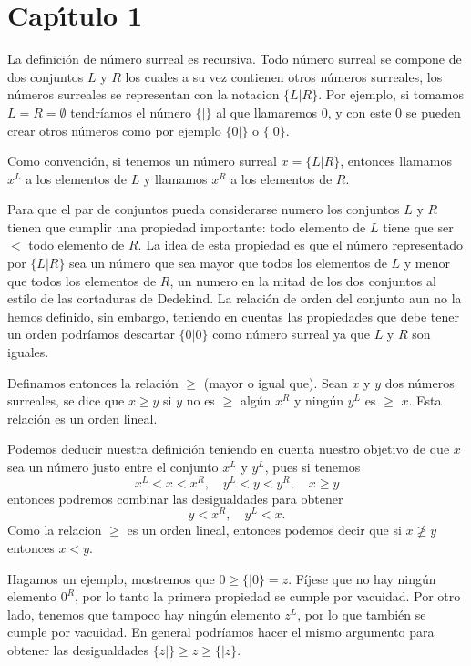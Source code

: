 \chapter{Cap\'{\i}tulo 1}
La definición de número surreal es recursiva. Todo número surreal se compone de dos conjuntos $L$ y $R$ los cuales a su vez contienen otros números surreales, los números surreales se representan con la notacion $\{L|R\}$. Por ejemplo, si tomamos $L=R=\emptyset$ tendríamos el número $\{|\}$ al que llamaremos $0$, y con este $0$ se pueden crear otros números como por ejemplo $\{0|\}$ o $\{|0\}$.
    
    Como convención, si tenemos un número surreal $x=\{L|R\}$, entonces llamamos $x^L$ a los elementos de $L$ y llamamos $x^R$ a los elementos de $R$.
    
    Para que el par de conjuntos pueda considerarse numero los conjuntos $L$ y $R$ tienen que cumplir una propiedad importante: todo elemento de $L$ tiene que ser $<$ todo elemento de $R$. La idea de esta propiedad es que el número representado por $\{L|R\}$ sea un número que sea mayor que todos los elementos de $L$ y menor que todos los elementos de $R$, un numero en la mitad de los dos conjuntos al estilo de las cortaduras de Dedekind. La relación de orden del conjunto aun no la hemos definido, sin embargo, teniendo en cuentas las propiedades que debe tener un orden podríamos descartar $\{0|0\}$ como número surreal ya que $L$ y $R$ son iguales. 
    
    Definamos entonces la relación $\ge$ (mayor o igual que). Sean $x$ y $y$ dos números surreales, se dice que $x\ge y$ si $y$ no es $\ge$ algún $x^R$ y ningún $y^L$ es $\ge$ $x$. Esta relación es un orden lineal.
    
    Podemos deducir nuestra definición teniendo en cuenta nuestro objetivo de que $x$ sea un número justo entre el conjunto $x^L$ y $y^L$, pues si tenemos
    \[
        x^L < x < x^R,\quad y^L < y < y^R,\quad x \ge y
    \]
    entonces podremos combinar las desigualdades para obtener
    \[
        y < x^R,\quad y^L < x.
    \]
    Como la relacion $\ge$ es un orden lineal, entonces podemos decir que si $x\not\ge y$ entonces $x < y$.
    
    Hagamos un ejemplo, mostremos que $0\ge\{|0\}=z$. Fíjese que no hay ningún elemento $0^R$, por lo tanto la primera propiedad se cumple por vacuidad. Por otro lado, tenemos que tampoco hay ningún elemento $z^L$, por lo que también se cumple por vacuidad. En general podríamos hacer el mismo argumento para obtener las desigualdades $\{z|\}\ge z\ge\{|z\}$.


